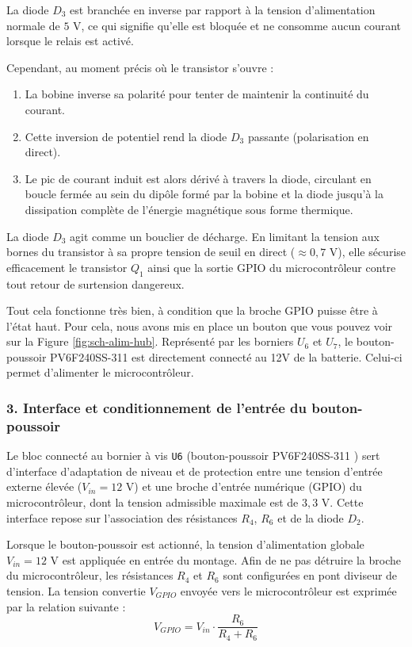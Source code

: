 \bigskip
La diode $D_3$ est branchée en inverse par rapport à la tension d'alimentation normale
de $5\text{ V}$, ce qui signifie qu'elle est bloquée et ne consomme aucun courant
lorsque le relais est activé.

Cependant, au moment précis où le transistor s'ouvre :
\begin{enumerate}
    \item La bobine inverse sa polarité pour tenter de maintenir la continuité du courant.
    \item Cette inversion de potentiel rend la diode $D_3$ passante (polarisation en direct).
    \item Le pic de courant induit est alors dérivé à travers la diode, circulant en boucle fermée au sein du dipôle formé par la bobine et la diode jusqu'à la dissipation complète de l'énergie magnétique sous forme thermique.
\end{enumerate}

 \bigskip
La diode $D_3$ agit comme un bouclier de décharge. En limitant la tension aux bornes
du transistor à sa propre tension de seuil en direct ($\approx 0{,}7\text{ V}$), 
elle sécurise efficacement le transistor $Q_1$ ainsi que la sortie GPIO du microcontrôleur
contre tout retour de surtension dangereux.

\bigskip
Tout cela fonctionne très bien, à condition que la broche GPIO puisse être à l'état haut.
Pour cela, nous avons mis en place un bouton que vous pouvez voir sur la Figure \ref{fig:sch-alim-hub}.
Représenté par les borniers $U_6$ et $U_7$, le bouton-poussoir PV6F240SS-311 \cite{bouton_poussoir_PV6F240SS-311}
est directement connecté au 12V de la batterie. Celui-ci permet d'alimenter le microcontrôleur.

\subsubsection*{3. Interface et conditionnement de l'entrée du bouton-poussoir}

Le bloc connecté au bornier à vis \texttt{U6} (bouton-poussoir PV6F240SS-311 \cite{bouton_poussoir_PV6F240SS-311})
sert d'interface d'adaptation de niveau et de protection entre une tension d'entrée externe élevée ($V_{in} = 12\text{ V}$) 
et une broche d'entrée numérique (GPIO) du microcontrôleur, dont la tension admissible maximale est de $3{,}3\text{ V}$. 
Cette interface repose sur l'association des résistances $R_4$, $R_6$ et de la diode $D_2$.

\bigskip
Lorsque le bouton-poussoir est actionné, la tension d'alimentation globale $V_{in} = 12\text{ V}$ est appliquée en entrée du montage. 
Afin de ne pas détruire la broche du microcontrôleur, les résistances $R_4$ et $R_6$ sont configurées en pont diviseur de tension.
La tension convertie $V_{GPIO}$ envoyée vers le microcontrôleur est exprimée par la relation suivante :
\begin{equation}
    V_{GPIO} = V_{in} \cdot \frac{R_6}{R_4 + R_6}
\end{equation}


